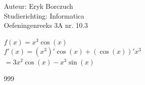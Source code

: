 \documentclass[a4paper]{article}
\begin{document}
  
\noindent \large Auteur: Eryk Borczuch \\
\noindent \large Studierichting: Informatica\\
\noindent \large Oefeningenreeks 3A nr. 10.3\\

\medskip

\normalsize

$f(x) = x^3 \cos(x)$\\

$f'(x) = (x^3)' \cos(x) + (\cos(x))' x^3$\\

$= 3x^2 \cos(x) - x^3 \sin(x)$\\

\begin{thebibliography}{999}
\end{thebibliography}
\end{document}
